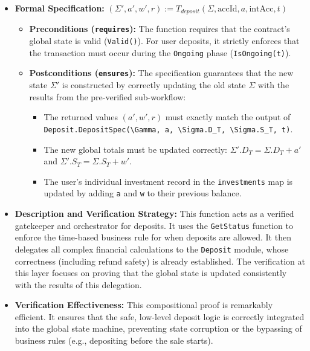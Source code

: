 \documentclass[
  english,
  onecolumn]{article}
\providecommand{\tightlist}{%
  \setlength{\itemsep}{0pt}\setlength{\parskip}{0pt}}
\begin{document}
\begin{itemize}
\tightlist
\item
  \textbf{Formal Specification:}
  \((\Sigma', a', w', r) := T_{deposit}(\Sigma, \text{accId}, a, \text{intAcc}, t)\)

  \begin{itemize}
  \tightlist
  \item
    \textbf{Preconditions (\texttt{requires}):} The function requires
    that the contract's global state is valid (\texttt{Valid()}). For
    user deposits, it strictly enforces that the transaction must occur
    during the \texttt{Ongoing} phase (\texttt{IsOngoing(t)}).
  \item
    \textbf{Postconditions (\texttt{ensures}):} The specification
    guarantees that the new state \(\Sigma'\) is constructed by
    correctly updating the old state \(\Sigma\) with the results from
    the pre-verified sub-workflow:

    \begin{itemize}
    \tightlist
    \item
      The returned values \((a', w', r)\) must exactly match the output
      of
      \texttt{Deposit.DepositSpec(\textbackslash{}Gamma,\ a,\ \textbackslash{}Sigma.D\_T,\ \textbackslash{}Sigma.S\_T,\ t)}.
    \item
      The new global totals must be updated correctly:
      \(\Sigma'.D_T = \Sigma.D_T + a'\) and
      \(\Sigma'.S_T = \Sigma.S_T + w'\).
    \item
      The user's individual investment record in the
      \texttt{investments} map is updated by adding
      \texttt{a\textquotesingle{}} and \texttt{w\textquotesingle{}} to
      their previous balance.
    \end{itemize}
  \end{itemize}
\item
  \textbf{Description and Verification Strategy:} This function acts as
  a verified gatekeeper and orchestrator for deposits. It uses the
  \texttt{GetStatus} function to enforce the time-based business rule
  for when deposits are allowed. It then delegates all complex financial
  calculations to the \texttt{Deposit} module, whose correctness
  (including refund safety) is already established. The verification at
  this layer focuses on proving that the global state is updated
  consistently with the results of this delegation.
\item
  \textbf{Verification Effectiveness:} This compositional proof is
  remarkably efficient. It ensures that the safe, low-level deposit
  logic is correctly integrated into the global state machine,
  preventing state corruption or the bypassing of business rules (e.g.,
  depositing before the sale starts).
\end{itemize}
\end{document}
